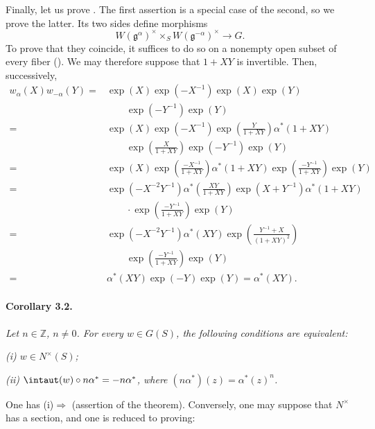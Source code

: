 Finally, let us prove \textup{}. The first assertion is a
special case of the second, so we prove the latter. Its two sides
define morphisms
\[
  W(\mathfrak g^\alpha)^\times
    \times_S W(\mathfrak g^{-\alpha})^\times
  \longrightarrow G.
\]
To prove that they coincide, it suffices to do so on a nonempty
open subset of every fiber \textup{()}. We may
therefore suppose that \(1+XY\) is invertible. Then, successively,
\[
\begin{aligned}
  w_\alpha(X)w_{-\alpha}(Y)
    ={}&\exp(X)\exp(-X^{-1})\exp(X)
        \exp(Y)\\
       &\qquad{}\exp(-Y^{-1})\exp(Y)\\
    ={}&\exp(X)\exp(-X^{-1})
        \exp\left(\frac{Y}{1+XY}\right)
        \alpha^\ast(1+XY)\\
       &\qquad{}
        \exp\left(\frac{X}{1+XY}\right)
        \exp(-Y^{-1})\exp(Y)\\
    ={}&\exp(X)
        \exp\left(\frac{-X^{-1}}{1+XY}\right)
        \alpha^\ast(1+XY)
        \exp\left(\frac{-Y^{-1}}{1+XY}\right)\exp(Y)\\
    ={}&\exp(-X^{-2}Y^{-1})
        \alpha^\ast\left(\frac{XY}{1+XY}\right)
        \exp(X+Y^{-1})\alpha^\ast(1+XY)\\
       &{}\qquad\cdot
        \exp\left(\frac{-Y^{-1}}{1+XY}\right)\exp(Y)\\
    ={}&\exp(-X^{-2}Y^{-1})\alpha^\ast(XY)
        \exp\left(\frac{Y^{-1}+X}{(1+XY)^2}\right)\\
       &\qquad{}
        \exp\left(\frac{-Y^{-1}}{1+XY}\right)\exp(Y)\\
    ={}&\alpha^\ast(XY)\exp(-Y)\exp(Y)
        =\alpha^\ast(XY).
\end{aligned}
\]

\paragraph{\textbf{Corollary 3.2.}}
\emph{Let \(n\in\mathbb Z\), \(n\ne0\). For every \(w\in G(S)\),
the following conditions are equivalent:}

\smallskip
\noindent\emph{\textup{(i)} \(w\in N^\times(S)\);}

\smallskip
\noindent\emph{\textup{(ii)}
\(\intaut(w)\circ n\alpha^\ast=-n\alpha^\ast\), where
\((n\alpha^\ast)(z)=\alpha^\ast(z)^n\).}

\smallskip
One has \textup{(i)}\(\Rightarrow\)\textup{} \textup{(}assertion
\textup{} of the theorem\textup{)}. Conversely, one may suppose that \(N^\times\) has a
section, and one is reduced to proving:

